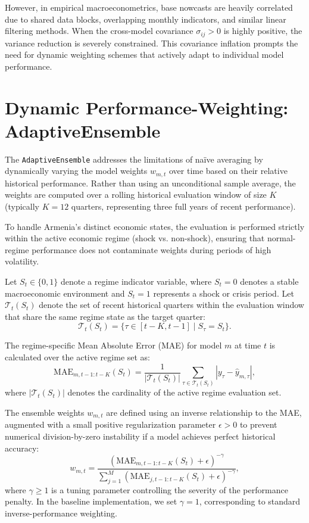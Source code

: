 \documentclass[12pt,a4paper]{article}
\begin{document}
However, in empirical macroeconometrics, base nowcasts are heavily correlated due to shared data blocks, overlapping monthly indicators, and similar linear filtering methods. When the cross-model covariance $\sigma_{ij} > 0$ is highly positive, the variance reduction is severely constrained. This covariance inflation prompts the need for dynamic weighting schemes that actively adapt to individual model performance.

\section{Dynamic Performance-Weighting: AdaptiveEnsemble}

The \texttt{AdaptiveEnsemble} addresses the limitations of na\"ive averaging by dynamically varying the model weights $w_{m,t}$ over time based on their relative historical performance. Rather than using an unconditional sample average, the weights are computed over a rolling historical evaluation window of size $K$ (typically $K=12$ quarters, representing three full years of recent performance). 

To handle Armenia's distinct economic states, the evaluation is performed strictly within the active economic regime (shock vs. non-shock), ensuring that normal-regime performance does not contaminate weights during periods of high volatility.

Let $S_t \in \{0, 1\}$ denote a regime indicator variable, where $S_t=0$ denotes a stable macroeconomic environment and $S_t=1$ represents a shock or crisis period. Let $\mathcal{T}_t(S_t)$ denote the set of recent historical quarters within the evaluation window that share the same regime state as the target quarter:
\begin{equation}
    \mathcal{T}_t(S_t) = \{\tau \in [t-K, t-1] \mid S_{\tau} = S_t\}.
\end{equation}

The regime-specific Mean Absolute Error (MAE) for model $m$ at time $t$ is calculated over the active regime set as:
\begin{equation}
    \text{MAE}_{m,t-1:t-K}(S_t) = \frac{1}{|\mathcal{T}_t(S_t)|} \sum_{\tau \in \mathcal{T}_t(S_t)} |y_{\tau} - \hat{y}_{m,\tau}|,
\end{equation}
where $|\mathcal{T}_t(S_t)|$ denotes the cardinality of the active regime evaluation set.

The ensemble weights $w_{m,t}$ are defined using an inverse relationship to the MAE, augmented with a small positive regularization parameter $\epsilon > 0$ to prevent numerical division-by-zero instability if a model achieves perfect historical accuracy:
\begin{equation}
    w_{m,t} = \frac{\left( \text{MAE}_{m,t-1:t-K}(S_t) + \epsilon \right)^{-\gamma}}{\sum_{j=1}^{M} \left( \text{MAE}_{j,t-1:t-K}(S_t) + \epsilon \right)^{-\gamma}},
\end{equation}
where $\gamma \geq 1$ is a tuning parameter controlling the severity of the performance penalty. In the baseline implementation, we set $\gamma = 1$, corresponding to standard inverse-performance weighting.
\end{document}
